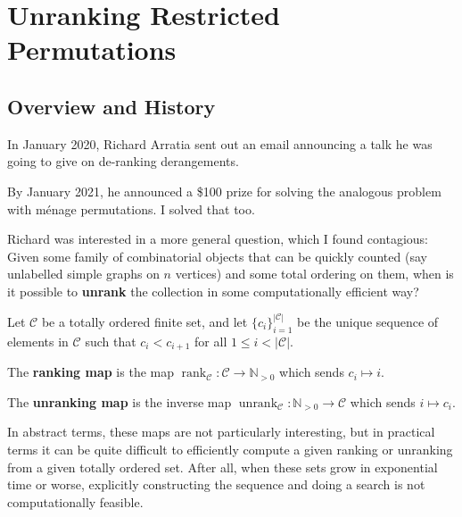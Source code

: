 \chapter{Unranking Restricted Permutations}
\label{cha:UnrankingMenage}

\section{Overview and History}

In January 2020, Richard Arratia sent out an email announcing a talk he was
going to give on de-ranking derangements.

By January 2021, he announced a \$100 prize for solving the analogous problem
with m\'enage permutations. I solved that too.

Richard was interested in a more general question, which I found contagious:
Given some family of combinatorial objects that can be quickly counted
(say unlabelled simple graphs on $n$ vertices)
and some total ordering on them,
when is it possible to \textbf{unrank} the collection in some computationally
efficient way?

\begin{definition}
  Let $\mathcal C$ be a totally ordered finite set, and
  let $\{c_i\}_{i=1}^{|\mathcal C|}$ be the unique sequence of elements in
  $\mathcal{C}$ such that $c_i < c_{i+1}$ for all $1 \leq i < |\mathcal{C}|$.

  The \textbf{ranking map} is the map
  $\operatorname{rank}_{\mathcal{C}} \colon \mathcal{C} \rightarrow \mathbb N_{>0}$
  which sends $c_i \mapsto i$.

  The \textbf{unranking map} is the inverse map
  $\operatorname{unrank}_{\mathcal{C}} \colon \mathbb N_{>0} \rightarrow \mathcal{C}$
  which sends $i \mapsto c_i$.
\end{definition}

In abstract terms, these maps are not particularly interesting, but in practical
terms it can be quite difficult to efficiently compute a given ranking or
unranking from a given totally ordered set. After all, when these sets
grow in exponential time or worse, explicitly constructing the sequence and
doing a search is not computationally feasible.

